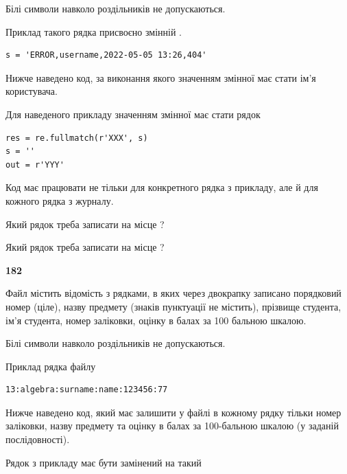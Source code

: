 Білі символи навколо роздільників не допускаються.

Приклад такого рядка присвоєно змінній .



\begin{verbatim}
s = 'ERROR,username,2022-05-05 13:26,404'
\end{verbatim}


Нижче наведено код, за виконання якого значенням змінної  має стати ім'я користувача.

Для наведеного прикладу значенням змінної  має стати рядок 



\begin{verbatim}
res = re.fullmatch(r'XXX', s)
s = ''
out = r'YYY'
\end{verbatim}


Код має працювати не тільки для конкретного рядка з прикладу, але й для кожного рядка з журналу.




Який рядок треба записати на місце  ?\par
\vspace{5mm}


Який рядок треба записати на місце  ?\par


\newpage

{\begin {center}\textbf{ 182}\end {center}}\par
Файл  містить відомість з рядками, в яких через двокрапку записа\-но поряд\-ковий номер (ціле), назву предмету (знаків пунктуації не містить), прізвище студента, ім'я студента, номер заліковки, оцінку в балах за 100 бальною шкалою.

Білі символи навколо роздільників не допускаються.

Приклад рядка файлу



\begin{verbatim}
13:algebra:surname:name:123456:77
\end{verbatim}


Нижче наведено код, який має залишити у файлі в кожному рядку тільки номер заліковки, назву предмету та оцінку в балах за 100-бальною шкалою (у заданій послі\-дов\-ності).

Рядок з прикладу має бути замінений на такий



